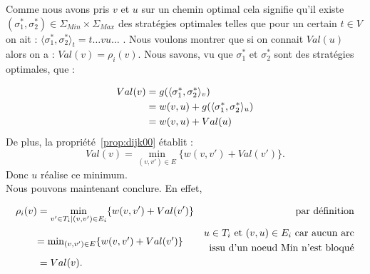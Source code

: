 \begin{demonstration}
$\text{}$\\
	Comme nous avons pris $v$ et $u$ sur un chemin optimal cela signifie qu'il existe $(\sigma_1^*, \sigma_2^*) \in \Sigma_{Min} \times \Sigma_{Max}$ des stratégies optimales telles que pour un certain $t \in V$ on ait : $\langle \sigma_1^*, \sigma_2^* \rangle_t = t\ldots vu\ldots$ .
Nous voulons montrer que si on connait $Val(u)$ alors on a : $Val(v) = \rho_i(v)$.
Nous savons, vu que $\sigma_1^*$ et $ \sigma_2^*$ sont des stratégies optimales, que :

\begin{align*}
Val(v) &= g(\langle \sigma_1^*,\sigma_2^* \rangle_v) \notag \\
 	   &= w(v,u) + g(\langle \sigma_1^*,\sigma_2^* \rangle_u) \notag \\
       &= w(v,u) + Val(u) 
\end{align*}
De plus, la propriété~\ref{prop:dijk00} établit :
$$Val(v) = \min_{(v,v') \in E}\{ w(v,v') + Val(v') \}.$$
Donc $u$ réalise ce minimum.\\
Nous pouvons maintenant conclure. En effet,

\begin{align*}
	\rho_i(v) &= \min_{v' \in T_i | (v,v') \in E_i} \{ w(v,v') + Val(v') \} & \text{par définition} \\
	& \multirow{2}{*}{$= \min_{(v,v') \in E}\{ w(v,v') + Val(v') \}$} & u \in T_i \text{ et } (v,u) \in E_i \text{ car aucun arc} \\&&\text{ issu d'un noeud Min n'est bloqué}\\
	&= Val(v).
\end{align*}



\begin{comment}

Nous voulons donc établir que:
\begin{align*}
w(v,u) + Val(u) &= \min_{v' \in T_i, (v,v') \in E_i} \{ w(v,v') + Val(v') \}\\ &= \min_{v' \in T_i, (v,v') \in E} \{ w(v,v') + Val(v') \}
\end{align*}

La deuxième égalité est due au fait qu'on ne bloque pas d'arc issu d'un noeud du joueur Min et que $v\in V_{Min}$.
De plus, comme le noeud $u$ a déjà été entièrement traité, on connait $Val(u)$ et il a été relaxé. Calculer $\min_{v' \in T_i, (v,v') \in E} \{ w(v,v') + Val(v') \}$ revient à prendre la valeur stockée dans $v.S$. Nous voulons donc montrer que $w(v,u) + Val(u)$ est cette valeur.


\end{comment}
\end{demonstration}
